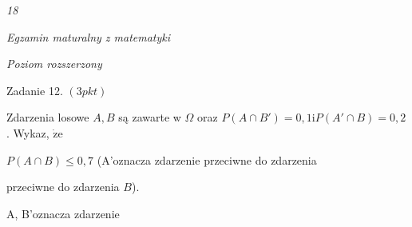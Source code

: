 \documentclass[a4paper,12pt]{article}
\begin{document}
{\it 18}

{\it Egzamin maturalny z matematyki}

{\it Poziom rozszerzony}

Zadanie 12. $(3pkt)$

Zdarzenia losowe $A, B$ są zawarte w $\Omega$ oraz $P(A\cap B')=0,1 \mathrm{i}P(A'\cap B)=0,2$. Wykaz, $\dot{\mathrm{z}}\mathrm{e}$

$P(A\cap B)\leq 0,7$ (A'oznacza zdarzenie przeciwne do zdarzenia

przeciwne do zdarzenia $B$).

A, B'oznacza zdarzenie
\end{document}
